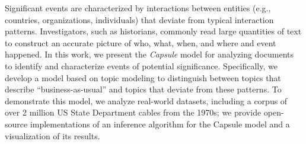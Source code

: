 
Significant events are characterized by interactions between entities (e.g., countries, organizations, individuals) that deviate from typical interaction patterns.  Investigators, such as historians, commonly read large quantities of text to construct an accurate picture of who, what, when, and where and event happened.  In this work, we present the \emph{Capsule} model for analyzing documents to identify and characterize events of potential significance.
Specifically, we develop a model based on topic modeling to distinguish between topics that describe ``business-as-usual'' and topics that deviate from these patterns.
To demonstrate this model, we analyze real-world datasets, including a corpus of over 2 million US State Department cables from the 1970s; we provide open-source implementations of an inference algorithm for the Capsule model and a visualization of its results.